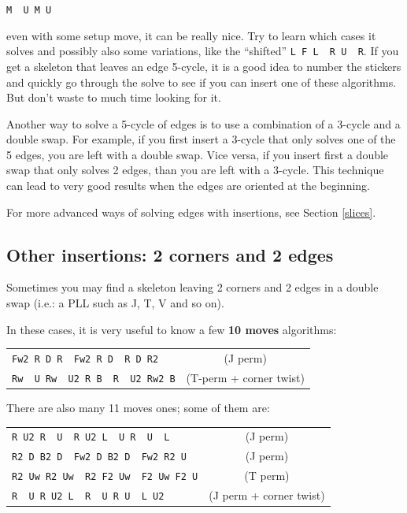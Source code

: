 \documentclass[11pt,a4paper]{book}
\newcommand{\p}{\textquotesingle}
\newcommand{\m}{\texttt}
\newcommand{\ps}{\p\,\,}
\begin{document}
\begin{center}
\m{M\ps U M U\p}
\end{center}

even with some setup move, it can be really nice. Try to learn which cases it solves and possibly also some variations, like the ``shifted'' \m{L F L\ps R U\ps R\p}. If you get a skeleton that leaves an edge 5-cycle, it is a good idea to number the stickers and quickly go through the solve to see if you can insert one of these algorithms. But don't waste to much time looking for it.

Another way to solve a 5-cycle of edges is to use a combination of a 3-cycle and a double swap. For example, if you first insert a 3-cycle that only solves one of the 5 edges, you are left with a double swap. Vice versa, if you insert first a double swap that only solves 2 edges, than you are left with a 3-cycle. This technique can lead to very good results when the edges are oriented at the beginning.

For more advanced ways of solving edges with insertions, see Section \ref{slices}.

\subsection{Other insertions: 2 corners and 2 edges}

Sometimes you may find a skeleton leaving 2 corners and 2 edges in a double swap (i.e.: a PLL such as J, T, V and so on).

In these cases, it is very useful to know a few \textbf{10 moves} algorithms:

\begin{center}
\begin{tabular}{lc}
\m{Fw2 R D R\ps Fw2 R D\ps R D R2} & (J perm)\\
\m{Rw\ps U Rw\ps U2 R B\ps R\ps U2 Rw2 B\p} & (T-perm + corner twist)
\end{tabular}
\end{center}

There are also many 11 moves ones; some of them are:

\begin{center}
\begin{tabular}{lc}
\m{R U2 R\ps U\ps R U2 L\ps U R\ps U\ps L} & (J perm)\\
\m{R2 D B2 D\ps Fw2 D B2 D\ps Fw2 R2 U\p} & (J perm)\\
\m{R2 Uw R2 Uw\ps R2 F2 Uw\ps F2 Uw F2 U\p} & (T perm)\\
\m{R\ps U R U2 L\ps R\ps U R U\ps L U2} & (J perm + corner twist)
\end{tabular}
\end{center}
\end{document}
